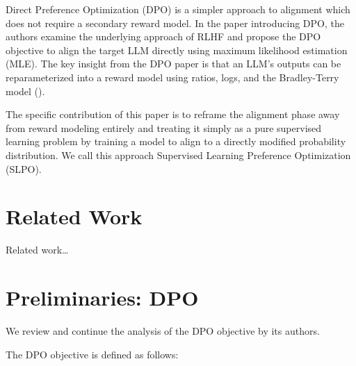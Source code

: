 \documentclass[twoside,11pt]{article}
\begin{document}
Direct Preference Optimization (DPO) is a simpler approach to alignment
which does not require a secondary reward model. In the paper introducing
DPO, the authors examine the underlying
approach of RLHF and propose
the DPO objective to align the target LLM directly using
maximum likelihood estimation (MLE). 
The key insight from the DPO paper is that an LLM's
outputs can be reparameterized into a reward model using ratios, logs,
and the Bradley-Terry model (\cite{bradley1952rank}).

The specific contribution of this paper is to reframe the alignment
phase away from reward modeling entirely and treating it simply as
a pure supervised learning problem by training a model to align to
a directly modified probability distribution. We call this
approach Supervised Learning Preference Optimization (SLPO).

\section{Related Work}

Related work\dots

\section{Preliminaries: DPO}

We review and continue the analysis of the DPO objective by its 
authors.

The DPO objective is defined as follows:
\end{document}
